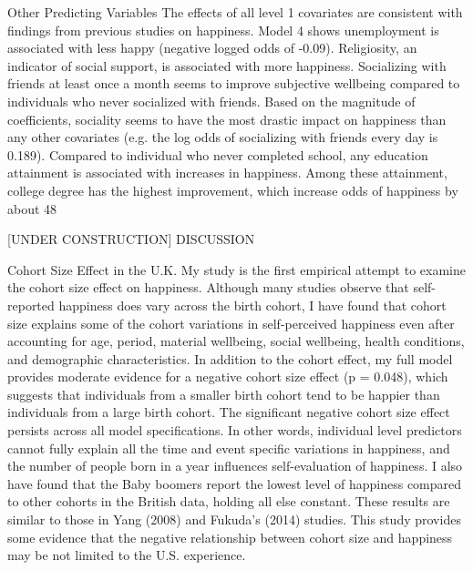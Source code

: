 Other Predicting Variables
	The effects of all level 1 covariates are consistent with findings from previous studies on happiness. Model 4 shows unemployment is associated with less happy (negative logged odds of -0.09). Religiosity, an indicator of social support, is associated with more happiness. Socializing with friends at least once a month seems to improve subjective wellbeing compared to individuals who never socialized with friends. Based on the magnitude of coefficients, sociality seems to have the most drastic impact on happiness than any other covariates (e.g. the log odds of socializing with friends every day is 0.189). Compared to individual who never completed school, any education attainment is associated with increases in happiness. Among these attainment, college degree has the highest improvement, which increase odds of happiness by about 48%

[UNDER CONSTRUCTION]
DISCUSSION

Cohort Size Effect in the U.K.
My study is the first empirical attempt to examine the cohort size effect on happiness. Although many studies observe that self-reported happiness does vary across the birth cohort, I have found that cohort size explains some of the cohort variations in self-perceived happiness even after accounting for age, period, material wellbeing, social wellbeing, health conditions, and demographic characteristics. In addition to the cohort effect, my full model provides moderate evidence for a negative cohort size effect (p = 0.048), which suggests that individuals from a smaller birth cohort tend to be happier than individuals from a large birth cohort. The significant negative cohort size effect persists across all model specifications. In other words, individual level predictors cannot fully explain all the time and event specific variations in happiness, and the number of people born in a year influences self-evaluation of happiness. I also have found that the Baby boomers report the lowest level of happiness compared to other cohorts in the British data, holding all else constant. These results are similar to those in Yang (2008) and Fukuda’s (2014) studies. This study provides some evidence that the negative relationship between cohort size and happiness may be not limited to the U.S. experience.

